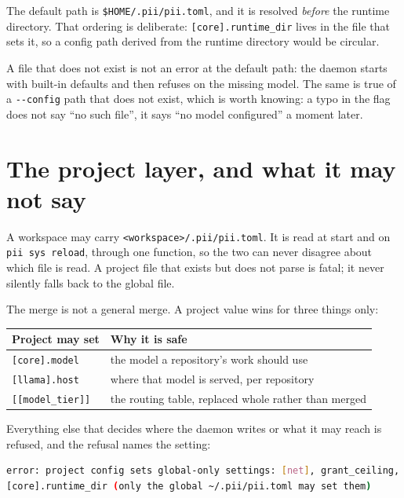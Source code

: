 The default path is \texttt{\$HOME/.pii/pii.toml}, and it is resolved \emph{before} the runtime
directory. That ordering is deliberate: \texttt{[core].runtime\_dir} lives in the file that
sets it, so a config path derived from the runtime directory would be circular.

A file that does not exist is not an error at the default path: the daemon starts with
built-in defaults and then refuses on the missing model. The same is true of a
\texttt{-{}-config} path that does not exist, which is worth knowing: a typo in the flag does
not say \enquote{no such file}, it says \enquote{no model configured} a moment later.

\section{The project layer, and what it may not say}

A workspace may carry \texttt{<workspace>/.pii/pii.toml}. It is read at start and on
\texttt{pii sys reload}, through one function, so the two can never disagree about which file
is read. A project file that exists but does not parse is fatal; it never silently falls back
to the global file.

The merge is not a general merge. A project value wins for three things only:

\begin{center}
\begin{tabular}{@{}>{\raggedright\arraybackslash}p{}>{\raggedright\arraybackslash}p{}@{}}
  \toprule
  \textbf{Project may set} & \textbf{Why it is safe} \\
  \midrule
  \texttt{[core].model} & the model a repository's work should use \\
  \texttt{[llama].host} & where that model is served, per repository \\
  \texttt{[[model\_tier]]} & the routing table, replaced whole rather than merged \\
  \bottomrule
\end{tabular}
\end{center}

Everything else that decides where the daemon writes or what it may reach is refused, and the
refusal names the setting:

\begin{lstlisting}[language=bash]
error: project config sets global-only settings: [net], grant_ceiling,
[core].runtime_dir (only the global ~/.pii/pii.toml may set them)
\end{lstlisting}

